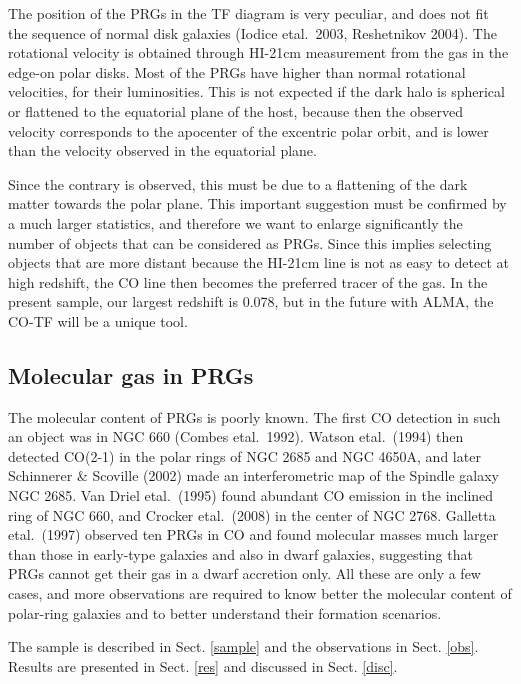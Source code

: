 \documentclass[traditabstract]{aa}
\def\ts     {\thinspace}
\def\etal   {{\rm et\ts al.}~}
\begin{document}
The position of the PRGs in the TF diagram is very peculiar,
and does not fit the sequence of normal disk galaxies (Iodice \etal 2003, Reshetnikov 2004). The rotational
velocity is obtained through HI-21cm measurement from the gas in the
edge-on polar disks.
Most of the PRGs have higher than normal rotational velocities,
for their luminosities.  This is not expected  if the dark halo
is spherical or flattened to the equatorial plane of the host,
because then the observed velocity corresponds
to the apocenter of the excentric polar orbit, and is lower
than the velocity observed in the equatorial plane.

Since the contrary is observed, this must be due to a flattening
of the dark matter towards the polar plane.  This
important suggestion must be confirmed by a much larger statistics,
and therefore we want to enlarge significantly the number of
objects that can be considered as PRGs. Since this implies selecting
objects that are more distant because the HI-21cm line is not as easy to detect
at high redshift, the CO line then becomes the preferred tracer of the gas.
In the present sample, our largest redshift is 0.078, but in the future with
ALMA, the CO-TF will be a unique tool.

\subsection{Molecular gas in PRGs}

 The molecular content of PRGs is poorly known. 
The first CO detection in such an object was in NGC 660
(Combes \etal 1992). Watson \etal (1994) then
detected CO(2-1) in the polar rings of NGC 2685 and NGC 4650A, and later
Schinnerer \& Scoville (2002) made an interferometric map of the Spindle galaxy
NGC 2685. Van Driel \etal (1995) found abundant CO emission in the
inclined ring of NGC 660,
and Crocker \etal (2008) in the center of NGC 2768.
Galletta \etal (1997) observed ten PRGs in CO and found molecular masses
much larger than those in early-type galaxies and also
in dwarf galaxies, suggesting that PRGs cannot get their gas in
 a dwarf accretion only. 
 All these are only a few cases, and more observations are required
 to know better the molecular content of polar-ring
galaxies and to better understand their formation scenarios.


The sample is described in Sect. \ref{sample} and the observations
in  Sect. \ref{obs}. Results are presented in  Sect. \ref{res} and
discussed in Sect. \ref{disc}. 
\end{document}
